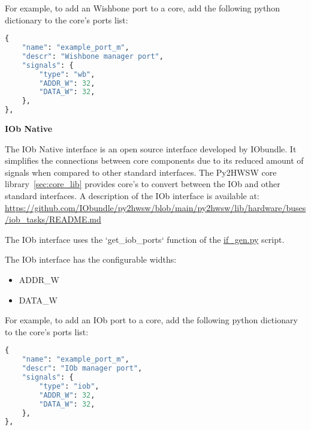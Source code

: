 For example, to add an Wishbone port to a core, add the following python dictionary to the core's ports list:
\begin{lstlisting}[language=python]
{
	"name": "example_port_m",
	"descr": "Wishbone manager port",
	"signals": {
		"type": "wb",
		"ADDR_W": 32,
		"DATA_W": 32,
	},
},
\end{lstlisting}


%
%
\clearpage
\large\textbf{IOb Native}

The IOb Native interface is an open source interface developed by IObundle.
It simplifies the connections between core components due to its reduced amount of signals when compared to other standard interfaces.
The Py2HWSW core library~\ref{sec:core_lib} provides core's to convert between the IOb and other standard interfaces.
A description of the IOb interface is available at:
\url{https://github.com/IObundle/py2hwsw/blob/main/py2hwsw/lib/hardware/buses/iob_tasks/README.md}

The IOb interface uses the `get\_iob\_ports` function of the \href{https://github.com/IObundle/py2hwsw/blob/main/py2hwsw/scripts/if_gen.py}{if\_gen.py} script.


The IOb interface has the configurable widths:
\begin{itemize}
  \item ADDR\_W
  \item DATA\_W
\end{itemize}

For example, to add an IOb port to a core, add the following python dictionary to the core's ports list:
\begin{lstlisting}[language=python]
{
	"name": "example_port_m",
	"descr": "IOb manager port",
	"signals": {
		"type": "iob",
		"ADDR_W": 32,
		"DATA_W": 32,
	},
},
\end{lstlisting}


